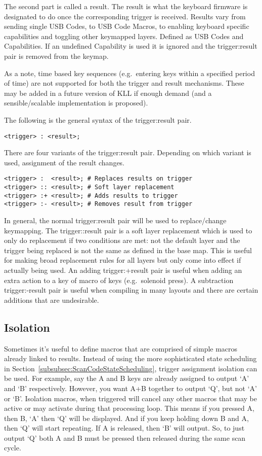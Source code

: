 \documentclass{kiibohd-template}
\begin{document}
The second part is called a result.
The result is what the keyboard firmware is designated to do once the corresponding trigger is received.
Results vary from sending single USB Codes, to USB Code Macros, to enabling keyboard specific capabilities and toggling other keymapped layers.
Defined as USB Codes and Capabilities.
If an undefined Capability is used it is ignored and the trigger:result pair is removed from the keymap.

As a note, time based key sequences (e.g.\ entering keys within a specified period of time) are not supported for both the trigger and result mechanisms.
These may be added in a future version of KLL if enough demand (and a sensible/scalable implementation is proposed).

The following is the general syntax of the trigger:result pair.

\begin{lstlisting}
<trigger> : <result>;
\end{lstlisting}

There are four variants of the trigger:result pair.
Depending on which variant is used, assignment of the result changes.

\begin{lstlisting}
<trigger> :  <result>; # Replaces results on trigger
<trigger> :: <result>; # Soft layer replacement
<trigger> :+ <result>; # Adds results to trigger
<trigger> :- <result>; # Removes result from trigger
\end{lstlisting}

In general, the normal trigger:result pair will be used to replace/change keymapping.
The trigger::result pair is a soft layer replacement which is used to only do replacement if two conditions are met: not the default layer and the trigger being replaced is not the same as defined in the base map.
This is useful for making broad replacement rules for all layers but only come into effect if actually being used.
An adding trigger:+result pair is useful when adding an extra action to a key of macro of keys (e.g.\ solenoid press).
A subtraction trigger:-result pair is useful when compiling in many layouts and there are certain additions that are undesirable.


\subsection{Isolation}

Sometimes it's useful to define macros that are comprised of simple macros already linked to results.
Instead of using the more sophisticated state scheduling in Section~\ref{subsubsec:ScanCodeStateScheduling}, trigger assignment isolation can be used.
For example, say the A and B keys are already assigned to output `A' and `B' respectively.
However, you want A+B together to output `Q', but not `A' or `B'.
Isolation macros, when triggered will cancel any other macros that may be active or may activate during that processing loop.
This means if you pressed A, then B, `A' then `Q' will be displayed.
And if you keep holding down B and A, then `Q' will start repeating.
If A is released, then `B' will output.
So, to just output `Q' both A and B must be pressed then released during the same scan cycle.
\end{document}
